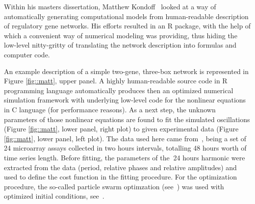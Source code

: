 Within his masters dissertation, Matthew
Kondoff~\cite{kondoff2015modeling} looked at a way of automatically
generating computational models from human-readable description of
regulatory gene networks. His efforts resulted in an R package, with
the help of which a convenient way of numerical modeling was
providing, thus hiding the low-level nitty-gritty of translating the
network description into formulas and computer code.


An example description of a simple two-gene, three-box network is
represented in Figure \ref{fig::matt}, upper panel. A highly
human-readable source code in R programming language automatically
produces then an optimized numerical simulation framework with
underlying low-level code for the nonlinear equations in C language
(for performance reasons). As a next step, the unknown parameters of
those nonlinear equations are found to fit the simulated oscillations
(Figure \ref{fig::matt}, lower panel, right plot) to given
experimental data (Figure \ref{fig::matt}, lower panel, left plot).
The data used here came from~\cite{zhang2014circadian}, being a set of
24 microarray assays collected in two hours intervals, totalling 48
hours worth of time series length. Before fitting, the parameters of
the $~$24 hours harmonic were extracted from the data (period,
relative phases and relative amplitudes) and used to define the cost
function in the fitting procedure. For the optimization procedure, the
so-called particle swarm optimzation (see~\cite{zambrano2012hydropso})
was used with optimized initial conditions,
see~\cite{richards2004choosing}.
